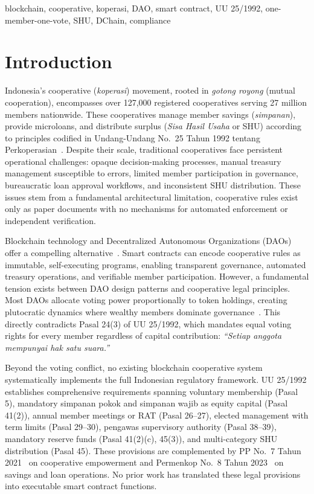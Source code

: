 \documentclass[conference]{IEEEtran}
\begin{document}
\begin{IEEEkeywords}
blockchain, cooperative, koperasi, DAO, smart contract, UU 25/1992, one-member-one-vote, SHU, DChain, compliance
\end{IEEEkeywords}

\section{Introduction}

Indonesia's cooperative (\textit{koperasi}) movement, rooted in \textit{gotong royong} (mutual cooperation), encompasses over 127,000 registered cooperatives serving 27 million members nationwide. These cooperatives manage member savings (\textit{simpanan}), provide microloans, and distribute surplus (\textit{Sisa Hasil Usaha} or SHU) according to principles codified in Undang-Undang No.~25 Tahun 1992 tentang Perkoperasian~\cite{uu251992}. Despite their scale, traditional cooperatives face persistent operational challenges: opaque decision-making processes, manual treasury management susceptible to errors, limited member participation in governance, bureaucratic loan approval workflows, and inconsistent SHU distribution. These issues stem from a fundamental architectural limitation, cooperative rules exist only as paper documents with no mechanisms for automated enforcement or independent verification.

Blockchain technology and Decentralized Autonomous Organizations (DAOs) offer a compelling alternative~\cite{nakamoto2008bitcoin,buterin2014ethereum,wood2014ethereum}. Smart contracts can encode cooperative rules as immutable, self-executing programs, enabling transparent governance, automated treasury operations, and verifiable member participation. However, a fundamental tension exists between DAO design patterns and cooperative legal principles. Most DAOs allocate voting power proportionally to token holdings, creating plutocratic dynamics where wealthy members dominate governance~\cite{tamai2024dao,sharma2024future,sun2022multiparty}. This directly contradicts Pasal 24(3) of UU 25/1992, which mandates equal voting rights for every member regardless of capital contribution: \textit{``Setiap anggota mempunyai hak satu suara.''}

Beyond the voting conflict, no existing blockchain cooperative system systematically implements the full Indonesian regulatory framework. UU 25/1992 establishes comprehensive requirements spanning voluntary membership (Pasal 5), mandatory simpanan pokok and simpanan wajib as equity capital (Pasal 41(2)), annual member meetings or RAT (Pasal 26--27), elected management with term limits (Pasal 29--30), pengawas supervisory authority (Pasal 38--39), mandatory reserve funds (Pasal 41(2)(c), 45(3)), and multi-category SHU distribution (Pasal 45). These provisions are complemented by PP No.~7 Tahun 2021~\cite{pp72021} on cooperative empowerment and Permenkop No.~8 Tahun 2023~\cite{permenkop82023} on savings and loan operations. No prior work has translated these legal provisions into executable smart contract functions.
\end{document}
